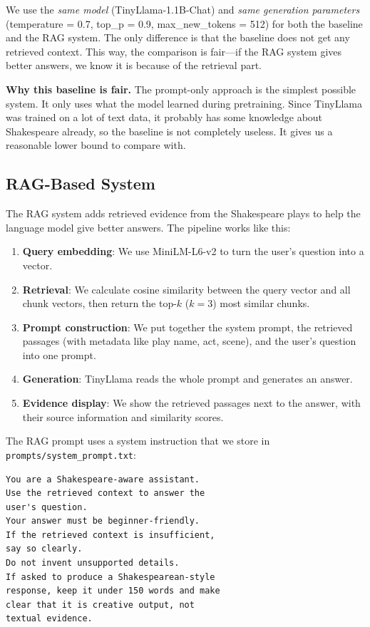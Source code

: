\documentclass[10pt,conference]{IEEEtran}
\begin{document}
We use the \textit{same model} (TinyLlama-1.1B-Chat) and \textit{same generation parameters} (temperature = 0.7, top\_p = 0.9, max\_new\_tokens = 512) for both the baseline and the RAG system. The only difference is that the baseline does not get any retrieved context. This way, the comparison is fair---if the RAG system gives better answers, we know it is because of the retrieval part.

\textbf{Why this baseline is fair.} The prompt-only approach is the simplest possible system. It only uses what the model learned during pretraining. Since TinyLlama was trained on a lot of text data, it probably has some knowledge about Shakespeare already, so the baseline is not completely useless. It gives us a reasonable lower bound to compare with.

\subsection{RAG-Based System}

The RAG system adds retrieved evidence from the Shakespeare plays to help the language model give better answers. The pipeline works like this:

\begin{enumerate}
    \item \textbf{Query embedding}: We use MiniLM-L6-v2 to turn the user's question into a vector.
    \item \textbf{Retrieval}: We calculate cosine similarity between the query vector and all chunk vectors, then return the top-$k$ ($k=3$) most similar chunks.
    \item \textbf{Prompt construction}: We put together the system prompt, the retrieved passages (with metadata like play name, act, scene), and the user's question into one prompt.
    \item \textbf{Generation}: TinyLlama reads the whole prompt and generates an answer.
    \item \textbf{Evidence display}: We show the retrieved passages next to the answer, with their source information and similarity scores.
\end{enumerate}

The RAG prompt uses a system instruction that we store in \texttt{prompts/system\_prompt.txt}:

\begin{lstlisting}[language={}]
You are a Shakespeare-aware assistant.
Use the retrieved context to answer the
user's question.
Your answer must be beginner-friendly.
If the retrieved context is insufficient,
say so clearly.
Do not invent unsupported details.
If asked to produce a Shakespearean-style
response, keep it under 150 words and make
clear that it is creative output, not
textual evidence.
\end{lstlisting}
\end{document}

